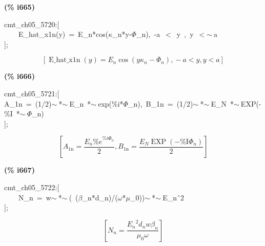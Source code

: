 \documentclass[fleqn]{article}
\begin{document}
\noindent
\begin{minipage}[t]{4.000000em}\color{red}\bfseries
(\% i665)	
\end{minipage}
\begin{minipage}[t]{\textwidth}\color{blue}
cmt\_ch05\_5720:[\\
\ \ \ \ E\_hat\_x1n(y)\ =\ E\_n*cos(\ensuremath{\kappa}\_n*y-\ensuremath{\Phi}\_n),\ -a\ \ensuremath{<}\ y\ ,\ y\ \ensuremath{<}\ensuremath{\sim\ }a\\
];
\end{minipage}
\[\displaystyle \tag{\% o665} 
\left[ \operatorname{E\_ hat\_ x1n}(y)={E_n} \cos{\left( y {{\kappa }_n}-{{\Phi }_n}\right) }\operatorname{,}-a\operatorname{<  }y\operatorname{,}y\operatorname{<  }a\right] \mbox{}
\]


\noindent
\begin{minipage}[t]{4.000000em}\color{red}\bfseries
(\% i666)	
\end{minipage}
\begin{minipage}[t]{\textwidth}\color{blue}
cmt\_ch05\_5721:[\\
A\_1n\ =\ (1/2)\ensuremath{\sim\ }*\ensuremath{\sim\ }E\_n\ *\ensuremath{\sim\ }exp(\%i*\ensuremath{\Phi}\_n),\ B\_1n\ =\ (1/2)\ensuremath{\sim\ }*\ensuremath{\sim\ }E\_N\ *\ensuremath{\sim\ }EXP(-\%I\ *\ensuremath{\sim\ }\ensuremath{\Phi}\_n)\\
];
\end{minipage}
\[\displaystyle \tag{\% o666} 
\left[ {A_{\ensuremath{\mathrm{1n}}}}=\frac{{E_n} {{\% e}^{\% i {{\Phi }_n}}}}{2}\operatorname{,}{B_{\ensuremath{\mathrm{1n}}}}=\frac{{E_N} \operatorname{EXP}\left( -\ensuremath{\mathrm{\% I}} {{\Phi }_n}\right) }{2}\right] \mbox{}
\]


\noindent
\begin{minipage}[t]{4.000000em}\color{red}\bfseries
(\% i667)	
\end{minipage}
\begin{minipage}[t]{\textwidth}\color{blue}
cmt\_ch05\_5722:[\\
\ \ \ \ N\_n\ =\ w\ensuremath{\sim\ }*\ensuremath{\sim\ }(\ (\ensuremath{\beta}\_n*d\_n)/(\ensuremath{\omega}*\ensuremath{\mu}\_0))\ensuremath{\sim\ }*\ensuremath{\sim\ }E\_n\^\ 2\\
];
\end{minipage}
\[\displaystyle \tag{\% o667} 
\left[ {N_n}=\frac{{{{E_n}}^{2}} {d_n} w {{\beta }_n}}{{{\mu }_0} \omega }\right] \mbox{}
\]
\end{document}
